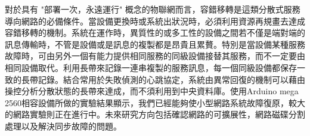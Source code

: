 \begin{abstractCH}

\setlength{\baselineskip}{1.5em}

對於具有 "部署一次，永遠運行" 概念的物聯網而言，容錯移轉是這類分散式服務導向網路的必備條件。當設備更換時或系統出狀況時，必須利用資源再規畫去達成容錯移轉的機制。系統在運作時，異質性的或多工性的設備之間若不僅是端對端的訊息傳輸時，不管是設備或是訊息的複製都是昂貴且累贅。特別是當設備某種服務故障時，可由另外一個有能力提供相同服務的同級設備接替其服務，而不一定要由相同設備取代。利用長帶來記錄一連串複製的服務訊息，每一個同級設備都保存一致的長帶記錄。結合常用於失敗偵測的心跳協定，系統由異常回復的機制可以藉由操控分析分散狀態的長帶來達成，而不須利用到中央資料庫。使用Arduino mega 2560相容設備所做的實驗結果顯示，我們已經能夠使小型網路系統故障復原，較大的網路實驗則正在進行中。未來研究方向包括確認網路的可擴展性，網路磁碟分割 處理以及解決同步故障的問題。

\end{abstractCH}
